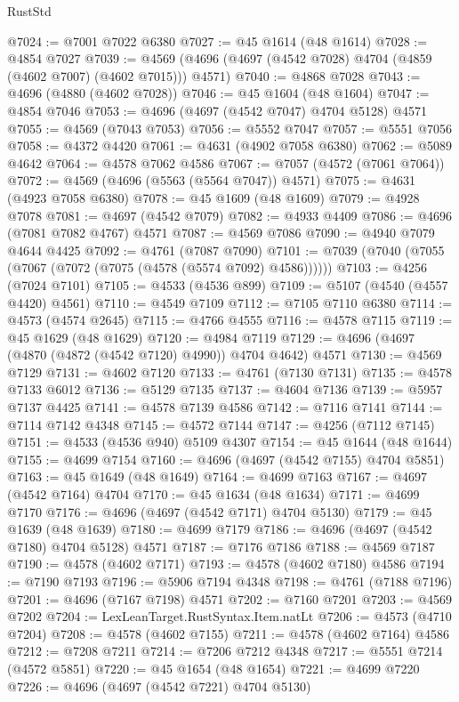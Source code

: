 \begin{lexlean}{RustStd}
\begin{coremodule}
@7024 := @7001 @7022 @6380
@7027 := @45 @1614 (@48 @1614)
@7028 := @4854 @7027
@7039 := @4569 (@4696 (@4697 (@4542 @7028) @4704 (@4859 (@4602 @7007) (@4602 @7015))) @4571)
@7040 := @4868 @7028
@7043 := @4696 (@4880 (@4602 @7028))
@7046 := @45 @1604 (@48 @1604)
@7047 := @4854 @7046
@7053 := @4696 (@4697 (@4542 @7047) @4704 @5128) @4571
@7055 := @4569 (@7043 @7053)
@7056 := @5552 @7047
@7057 := @5551 @7056
@7058 := @4372 @4420
@7061 := @4631 (@4902 @7058 @6380)
@7062 := @5089 @4642
@7064 := @4578 @7062 @4586
@7067 := @7057 (@4572 (@7061 @7064))
@7072 := @4569 (@4696 (@5563 (@5564 @7047)) @4571)
@7075 := @4631 (@4923 @7058 @6380)
@7078 := @45 @1609 (@48 @1609)
@7079 := @4928 @7078
@7081 := @4697 (@4542 @7079)
@7082 := @4933 @4409
@7086 := @4696 (@7081 @7082 @4767) @4571
@7087 := @4569 @7086
@7090 := @4940 @7079 @4644 @4425
@7092 := @4761 (@7087 @7090)
@7101 := @7039 (@7040 (@7055 (@7067 (@7072 (@7075 (@4578 (@5574 @7092) @4586))))))
@7103 := @4256 (@7024 @7101)
@7105 := @4533 (@4536 @899)
@7109 := @5107 (@4540 (@4557 @4420) @4561)
@7110 := @4549 @7109
@7112 := @7105 @7110 @6380
@7114 := @4573 (@4574 @2645)
@7115 := @4766 @4555
@7116 := @4578 @7115
@7119 := @45 @1629 (@48 @1629)
@7120 := @4984 @7119
@7129 := @4696 (@4697 (@4870 (@4872 (@4542 @7120) @4990)) @4704 @4642) @4571
@7130 := @4569 @7129
@7131 := @4602 @7120
@7133 := @4761 (@7130 @7131)
@7135 := @4578 @7133 @6012
@7136 := @5129 @7135
@7137 := @4604 @7136
@7139 := @5957 @7137 @4425
@7141 := @4578 @7139 @4586
@7142 := @7116 @7141
@7144 := @7114 @7142 @4348
@7145 := @4572 @7144
@7147 := @4256 (@7112 @7145)
@7151 := @4533 (@4536 @940) @5109 @4307
@7154 := @45 @1644 (@48 @1644)
@7155 := @4699 @7154
@7160 := @4696 (@4697 (@4542 @7155) @4704 @5851)
@7163 := @45 @1649 (@48 @1649)
@7164 := @4699 @7163
@7167 := @4697 (@4542 @7164) @4704
@7170 := @45 @1634 (@48 @1634)
@7171 := @4699 @7170
@7176 := @4696 (@4697 (@4542 @7171) @4704 @5130)
@7179 := @45 @1639 (@48 @1639)
@7180 := @4699 @7179
@7186 := @4696 (@4697 (@4542 @7180) @4704 @5128) @4571
@7187 := @7176 @7186
@7188 := @4569 @7187
@7190 := @4578 (@4602 @7171)
@7193 := @4578 (@4602 @7180) @4586
@7194 := @7190 @7193
@7196 := @5906 @7194 @4348
@7198 := @4761 (@7188 @7196)
@7201 := @4696 (@7167 @7198) @4571
@7202 := @7160 @7201
@7203 := @4569 @7202
@7204 := LexLeanTarget.RustSyntax.Item.natLt
@7206 := @4573 (@4710 @7204)
@7208 := @4578 (@4602 @7155)
@7211 := @4578 (@4602 @7164) @4586
@7212 := @7208 @7211
@7214 := @7206 @7212 @4348
@7217 := @5551 @7214 (@4572 @5851)
@7220 := @45 @1654 (@48 @1654)
@7221 := @4699 @7220
@7226 := @4696 (@4697 (@4542 @7221) @4704 @5130)

\end{coremodule}
\end{lexlean}
